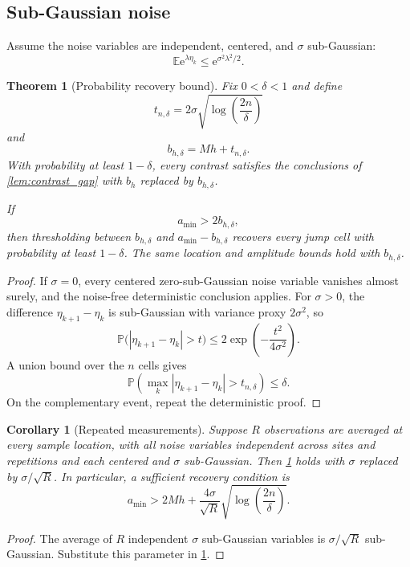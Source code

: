 \documentclass[11pt,letterpaper]{article}
\newtheorem{theorem}{Theorem}[section]
\theoremstyle{plain}
\theoremstyle{plain}
\theoremstyle{plain}
\newtheorem{corollary}[corollary]{Corollary}
\theoremstyle{definition}
\theoremstyle{definition}
\theoremstyle{definition}
\theoremstyle{definition}
\theoremstyle{remark}
\theoremstyle{remark}
\theoremstyle{remark}
\theoremstyle{remark}
\newcommand{\e}{\mathrm e}
\begin{document}
\subsection{Sub-Gaussian noise}

Assume the noise variables are independent, centered, and \(\sigma\) sub-Gaussian:
\[
\mathbb E\e^{\lambda\eta_k}
\leq
\e^{\sigma^2\lambda^2/2}.
\]

\begin{theorem}[Probability recovery bound]\label{thm:probability_recovery}
Fix \(0<\delta<1\) and define
\[
t_{n,\delta}
=
2\sigma
\sqrt{\log\left(\frac{2n}{\delta}\right)}
\]
and
\[
b_{h,\delta}=Mh+t_{n,\delta}.
\]
With probability at least \(1-\delta\), every contrast satisfies the conclusions of \cref{lem:contrast_gap} with \(b_h\) replaced by \(b_{h,\delta}\).

If
\[
a_{\min}>2b_{h,\delta},
\]
then thresholding between \(b_{h,\delta}\) and \(a_{\min}-b_{h,\delta}\) recovers every jump cell with probability at least \(1-\delta\). The same location and amplitude bounds hold with \(b_{h,\delta}\).
\end{theorem}

\begin{proof}
If \(\sigma=0\), every centered zero-sub-Gaussian noise variable vanishes almost surely, and the noise-free deterministic conclusion applies. For \(\sigma>0\), the difference \(\eta_{k+1}-\eta_k\) is sub-Gaussian with variance proxy \(2\sigma^2\), so
\[
\mathbb P\bigl(|\eta_{k+1}-\eta_k|>t\bigr)
\leq
2\exp\left(-\frac{t^2}{4\sigma^2}\right).
\]
A union bound over the \(n\) cells gives
\[
\mathbb P\left(
\max_k|\eta_{k+1}-\eta_k|>t_{n,\delta}
\right)
\leq
\delta.
\]
On the complementary event, repeat the deterministic proof.
\end{proof}

\begin{corollary}[Repeated measurements]\label{cor:repeated_measurements}
Suppose \(R\) observations are averaged at every sample location, with all noise variables independent across sites and repetitions and each centered and \(\sigma\) sub-Gaussian. Then \cref{thm:probability_recovery} holds with \(\sigma\) replaced by \(\sigma/\sqrt R\). In particular, a sufficient recovery condition is
\[
a_{\min}
>
2Mh+
\frac{4\sigma}{\sqrt R}
\sqrt{\log\left(\frac{2n}{\delta}\right)}.
\]
\end{corollary}

\begin{proof}
The average of \(R\) independent \(\sigma\) sub-Gaussian variables is \(\sigma/\sqrt R\) sub-Gaussian. Substitute this parameter in \cref{thm:probability_recovery}.
\end{proof}
\end{document}
